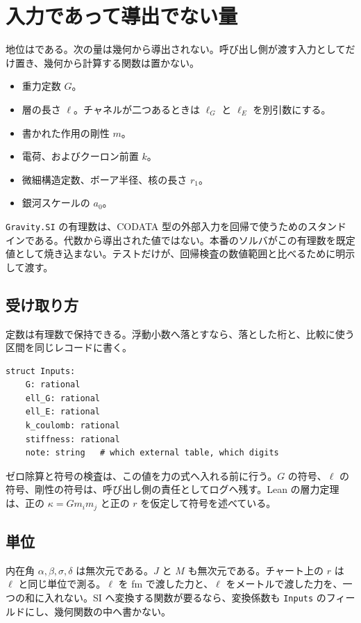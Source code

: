 \section{入力であって導出でない量}
\label{sec:inputs}

地位は\dstopen{}である。次の量は幾何から導出されない。呼び出し側が渡す入力としてだけ置き、幾何から計算する関数は置かない。

\begin{itemize}
\item 重力定数 \(G\)。
\item 層の長さ \(\ell\)。チャネルが二つあるときは \(\ell_G\) と \(\ell_E\) を別引数にする。
\item 書かれた作用の剛性 \(m\)。
\item 電荷、およびクーロン前置 \(k\)。
\item 微細構造定数、ボーア半径、核の長さ \(r_1\)。
\item 銀河スケールの \(a_0\)。
\end{itemize}

\texttt{Gravity.SI} の有理数は、CODATA 型の外部入力を回帰で使うためのスタンドインである。代数から導出された値ではない。本番のソルバがこの有理数を既定値として焼き込まない。テストだけが、回帰検査の数値範囲と比べるために明示して渡す。

\subsection{受け取り方}

定数は有理数で保持できる。浮動小数へ落とすなら、落とした桁と、比較に使う区間を同じレコードに書く。
\begin{verbatim}
struct Inputs:
    G: rational
    ell_G: rational
    ell_E: rational
    k_coulomb: rational
    stiffness: rational
    note: string   # which external table, which digits
\end{verbatim}
ゼロ除算と符号の検査は、この値を力の式へ入れる前に行う。\(G\) の符号、\(\ell\) の符号、剛性の符号は、呼び出し側の責任としてログへ残す。Lean の層力定理は、正の \(\kappa=G m_i m_j\) と正の \(r\) を仮定して符号を述べている。

\subsection{単位}

内在角 \(\alpha,\beta,\sigma,\delta\) は無次元である。\(J\) と \(M\) も無次元である。チャート上の \(r\) は \(\ell\) と同じ単位で測る。\(\ell\) を fm で渡した力と、\(\ell\) をメートルで渡した力を、一つの和に入れない。SI へ変換する関数が要るなら、変換係数も \texttt{Inputs} のフィールドにし、幾何関数の中へ書かない。

